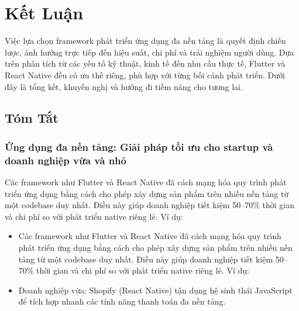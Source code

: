 \section{Kết Luận}

\begin{flushleft}
  \hspace*{0.8cm}Việc lựa chọn framework phát triển ứng dụng đa nền tảng là quyết định chiến lược, ảnh hưởng trực tiếp đến hiệu suất, chi phí và trải nghiệm người dùng. Dựa trên phân tích từ các yếu tố kỹ thuật, kinh tế đến nhu cầu thực tế, Flutter và React Native đều có ưu thế riêng, phù hợp với từng bối cảnh phát triển. Dưới đây là tổng kết, khuyến nghị và hướng đi tiềm năng cho tương lai.
\end{flushleft}

\subsection{Tóm Tắt}
\renewcommand{\labelitemi}{--}    
    \subsubsection{Ứng dụng đa nền tảng: Giải pháp tối ưu cho startup và doanh nghiệp vừa và nhỏ}
    \begin{flushleft}
      \hspace*{0.8cm}Các framework như Flutter và React Native đã cách mạng hóa quy trình phát triển ứng dụng bằng cách cho phép xây dựng sản phẩm trên nhiều nền tảng từ một codebase duy nhất. Điều này giúp doanh nghiệp tiết kiệm 50–70\% thời gian và chi phí so với phát triển native riêng lẻ. Ví dụ:
      \setlength{\leftmargini}{1.5cm}
      \begin{itemize}
        \item Các framework như Flutter và React Native đã cách mạng hóa quy trình phát triển ứng dụng bằng cách cho phép xây dựng sản phẩm trên nhiều nền tảng từ một codebase duy nhất. Điều này giúp doanh nghiệp tiết kiệm 50–70\% thời gian và chi phí so với phát triển native riêng lẻ. Ví dụ:
        \item Doanh nghiệp vừa: Shopify (React Native) tận dụng hệ sinh thái JavaScript để tích hợp nhanh các tính năng thanh toán đa nền tảng.
      \end{itemize}
    \end{flushleft}

